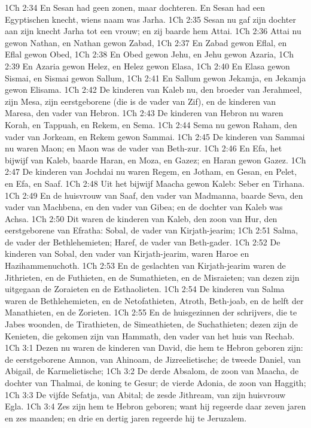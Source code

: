 1Ch 2:34  En Sesan had geen zonen, maar dochteren. En Sesan had een Egyptischen knecht, wiens naam was Jarha.
1Ch 2:35  Sesan nu gaf zijn dochter aan zijn knecht Jarha tot een vrouw; en zij baarde hem Attai.
1Ch 2:36  Attai nu gewon Nathan, en Nathan gewon Zabad,
1Ch 2:37  En Zabad gewon Eflal, en Eflal gewon Obed,
1Ch 2:38  En Obed gewon Jehu, en Jehu gewon Azaria,
1Ch 2:39  En Azaria gewon Helez, en Helez gewon Elasa,
1Ch 2:40  En Elasa gewon Sismai, en Sismai gewon Sallum,
1Ch 2:41  En Sallum gewon Jekamja, en Jekamja gewon Elisama.
1Ch 2:42  De kinderen van Kaleb nu, den broeder van Jerahmeel, zijn Mesa, zijn eerstgeborene (die is de vader van Zif), en de kinderen van Maresa, den vader van Hebron.
1Ch 2:43  De kinderen van Hebron nu waren Korah, en Tappuah, en Rekem, en Sema.
1Ch 2:44  Sema nu gewon Raham, den vader van Jorkeam, en Rekem gewon Sammai.
1Ch 2:45  De kinderen van Sammai nu waren Maon; en Maon was de vader van Beth-zur.
1Ch 2:46  En Efa, het bijwijf van Kaleb, baarde Haran, en Moza, en Gazez; en Haran gewon Gazez.
1Ch 2:47  De kinderen van Jochdai nu waren Regem, en Jotham, en Gesan, en Pelet, en Efa, en Saaf.
1Ch 2:48  Uit het bijwijf Maacha gewon Kaleb: Seber en Tirhana.
1Ch 2:49  En de huisvrouw van Saaf, den vader van Madmanna, baarde Seva, den vader van Machbena, en den vader van Gibea; en de dochter van Kaleb was Achsa.
1Ch 2:50  Dit waren de kinderen van Kaleb, den zoon van Hur, den eerstgeborene van Efratha: Sobal, de vader van Kirjath-jearim;
1Ch 2:51  Salma, de vader der Bethlehemieten; Haref, de vader van Beth-gader.
1Ch 2:52  De kinderen van Sobal, den vader van Kirjath-jearim, waren Haroe en Hazihammenuchoth.
1Ch 2:53  En de geslachten van Kirjath-jearim waren de Jithrieten, en de Futhieten, en de Sumathieten, en de Misraieten; van dezen zijn uitgegaan de Zoraieten en de Esthaolieten.
1Ch 2:54  De kinderen van Salma waren de Bethlehemieten, en de Netofathieten, Atroth, Beth-joab, en de helft der Manathieten, en de Zorieten.
1Ch 2:55  En de huisgezinnen der schrijvers, die te Jabes woonden, de Tirathieten, de Simeathieten, de Suchathieten; dezen zijn de Kenieten, die gekomen zijn van Hammath, den vader van het huis van Rechab.
1Ch 3:1  Dezen nu waren de kinderen van David, die hem te Hebron geboren zijn: de eerstgeborene Amnon, van Ahinoam, de Jizreelietische; de tweede Daniel, van Abigail, de Karmelietische;
1Ch 3:2  De derde Absalom, de zoon van Maacha, de dochter van Thalmai, de koning te Gesur; de vierde Adonia, de zoon van Haggith;
1Ch 3:3  De vijfde Sefatja, van Abital; de zesde Jithream, van zijn huisvrouw Egla.
1Ch 3:4  Zes zijn hem te Hebron geboren; want hij regeerde daar zeven jaren en zes maanden; en drie en dertig jaren regeerde hij te Jeruzalem.
